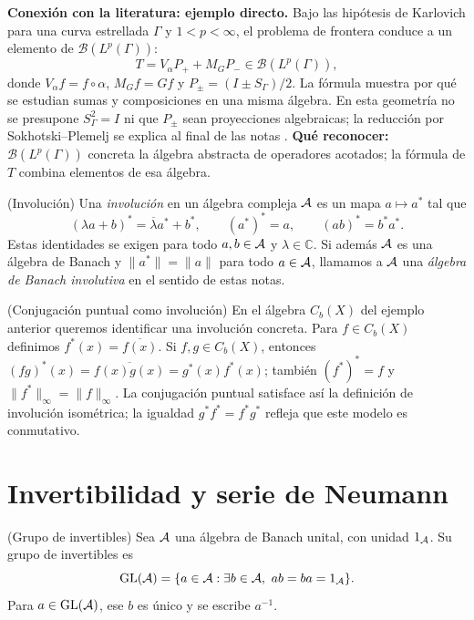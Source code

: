 \begin{investigacion}
\textbf{Conexión con la literatura: ejemplo directo.}
Bajo las hipótesis de Karlovich para una curva estrellada $\Gamma$ y $1<p<\infty$, el problema
de frontera conduce a un elemento de $\mathcal B(L^p(\Gamma))$:
\[
 T=V_\alpha P_+ + M_G P_-\in \mathcal B(L^p(\Gamma)),
\]
donde $V_\alpha f=f\circ\alpha$, $M_Gf=Gf$ y $P_\pm=(I\pm S_\Gamma)/2$.
La fórmula muestra por qué se estudian sumas y composiciones en una misma álgebra. En esta
geometría no se presupone $S_\Gamma^2=I$ ni que $P_\pm$ sean proyecciones algebraicas;
la reducción por Sokhotski--Plemelj se explica al final de las notas
\cite[pp.~463--464, ecs.~(1.1)--(1.2)]{Karlovich2017}.
\textbf{Qué reconocer:} $\mathcal B(L^p(\Gamma))$ concreta la álgebra abstracta de
operadores acotados; la fórmula de $T$ combina elementos de esa álgebra.
\end{investigacion}

\begin{cthdefinicion}{(Involución)}
Una \emph{involución} en un álgebra compleja $\mathcal A$ es un mapa $a\mapsto a^*$ tal que
\[
(\lambda a+b)^*=\overline\lambda a^*+b^*,\qquad
(a^*)^*=a,\qquad
(ab)^*=b^*a^*.
\]
Estas identidades se exigen para todo $a,b\in\mathcal A$ y $\lambda\in\mathbb C$.
Si además $\mathcal A$ es una álgebra de Banach y $\|a^*\|=\|a\|$ para
todo $a\in\mathcal A$, llamamos a $\mathcal A$ una \emph{álgebra de Banach involutiva}
en el sentido de estas notas.
\end{cthdefinicion}

\begin{cthejemplo}{(Conjugación puntual como involución)}
En el álgebra $C_b(X)$ del ejemplo anterior queremos identificar una
involución concreta. Para $f\in C_b(X)$ definimos
$f^*(x)=\overline{f(x)}$. Si $f,g\in C_b(X)$, entonces
$(fg)^*(x)=\overline{f(x)g(x)}=g^*(x)f^*(x)$;
también $(f^*)^*=f$ y $\|f^*\|_\infty=\|f\|_\infty$.
La conjugación puntual satisface así la definición de involución
isométrica; la igualdad $g^*f^*=f^*g^*$ refleja que este modelo es conmutativo.
\end{cthejemplo}

\section{Invertibilidad y serie de Neumann}

\begin{cthdefinicion}{(Grupo de invertibles)}
Sea $\mathcal A$ una álgebra de Banach unital, con unidad $1_\mathcal A$. Su grupo de invertibles es
\[
 \GL(\A)=\{a\in\A: \exists b\in\A,\ ab=ba=1_\A\}.
\]
Para $a\in\operatorname{GL}(\mathcal A)$, ese $b$ es único y se escribe $a^{-1}$.
\end{cthdefinicion}

